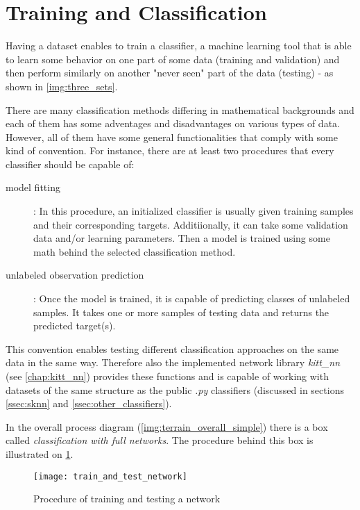 \section{Training and Classification}
Having a dataset enables to train a classifier, a machine learning tool that is able to learn some behavior on one part of some data (training and validation) and then perform similarly on another "never seen" part of the data (testing) - as shown in \cref{img:three_sets}.

There are many classification methods differing in mathematical backgrounds and each of them has some adventages and disadvantages on various types of data. However, all of them have some general functionalities that comply with some kind of convention. For instance, there are at least two procedures that every classifier should be capable of:

\begin{description}
\item[model fitting] : In this procedure, an initialized classifier is usually given training samples and their corresponding targets. Additiionally, it can take some validation data and/or learning parameters. Then a model is trained using some math behind the selected classification method.
\item[unlabeled observation prediction] : Once the model is trained, it is capable of predicting classes of unlabeled samples. It takes one or more samples of testing data and returns the predicted target(s).
\end{description}

This convention enables testing different classification approaches on the same data in the same way. Therefore also the implemented network library \textit{kitt\_nn} (see \cref{chap:kitt_nn}) provides these functions and is capable of working with datasets of the same structure as the public \textit{.py} classifiers (discussed in sections \ref{ssec:sknn} and \ref{ssec:other_classifiers}).

In the overall process diagram (\cref{img:terrain_overall_simple}) there is a box called \textit{classification with full networks}. The procedure behind this box is illustrated on \cref{img:train_and_test_network}.

\begin{figure}[H]
  \centering
  \texttt{[image: train\_and\_test\_network]}
  \caption{Procedure of training and testing a network}
  \label{img:train_and_test_network}
\end{figure}

